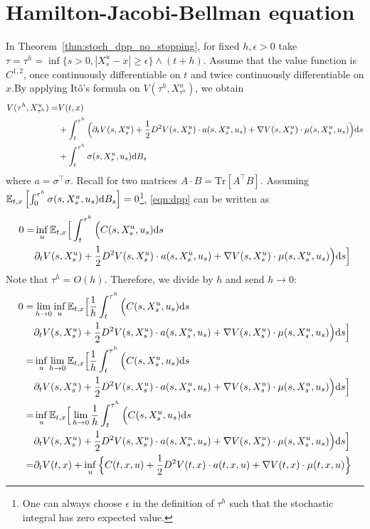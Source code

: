 \documentclass[11pt]{book}
\newcommand{\dd}{\text{\normalfont d}}
\newcommand{\ds}{\text{\normalfont d}s}
\begin{document}
\section{Hamilton-Jacobi-Bellman equation}
In Theorem~\ref{thm:stoch_dpp_no_stopping}, for fixed $h,\epsilon>0$ take $\tau=\tau^h=\inf\{s>0, |X_s^u-x|\ge \epsilon\}\wedge (t+h)$. Assume that the value function is $C^{1,2}$, once continuously differentiable on $t$ and twice continuously differentiable on $x$.By applying It\^o's formula on $V({\tau^h},X_{\tau^h}^u)$, we obtain
\begin{equation}
\begin{split}
    V({\tau^h},X_{\tau^h}^u)=&V(t,x)\\
    &+\int_t^{\tau^h} \Big(\partial_t V(s,X_s^u)+\frac12 D^2V(s,X_s^u) \cdot a(s,X_s^u,u_s) + \nabla V(s,X_s^u)\cdot \mu(s,X_s^u,u_s)\Big){{\ds}}\\
    &+\int_t^{\tau^h} \sigma(s,X_s^u,u_s){\dd}B_s
\end{split}
\end{equation}
where $a=\sigma^\intercal\sigma$. Recall  for two matrices $A\cdot B=\textrm{Tr}[A^\intercal B]$.  Assuming $\mathbb{E}_{t,x}\left[\int_0^{\tau^h} \sigma(s,X_s^u,u_s){\dd}B_s\right]=0$\footnote{One can always choose $\epsilon$ in the definition of ${\tau^h}$ such that the stochastic integral has zero expected value.}, \eqref{eqn:dpp} can be written as
\begin{equation}
    \begin{split}
        0 =&\inf_{u}\mathbb{E}_{t,x}\Big[\int_t^{\tau^h} \Big( C(s,X^u_s,u_s){{\ds}} \\
        & \partial_t V(s,X_s^u)+\frac12 D^2V(s,X_s^u) \cdot a(s,X_s^u,u_s) + \nabla V(s,X_s^u)\cdot \mu(s,X_s^u,u_s)\Big){{\ds}}\Big]
    \end{split}
\end{equation}
Note that ${\tau^h}=O(h)$. Therefore, we divide by $h$ and send $h\to0$:
\begin{equation}
    \begin{split}
        0 =&\lim_{h\to0}\inf_{u}\mathbb{E}_{t,x}\Big[\frac1h\int_t^{\tau^h} \Big( C(s,X^u_s,u_s){{\ds}} \\
        & \partial_t V(s,X_s^u)+\frac12 D^2V(s,X_s^u) \cdot a(s,X_s^u,u_s) + \nabla V(s,X_s^u)\cdot \mu(s,X_s^u,u_s)\Big){{\ds}}\Big]\\
        =&\inf_{u}\lim_{h\to0} \mathbb{E}_{t,x}\Big[\frac1h\int_t^{\tau^h} \Big( C(s,X^u_s,u_s){{\ds}} \\
        & \partial_t V(s,X_s^u)+\frac12 D^2V(s,X_s^u) \cdot a(s,X_s^u,u_s) + \nabla V(s,X_s^u)\cdot \mu(s,X_s^u,u_s)\Big){{\ds}}\Big]\\
        =&\inf_{u} \mathbb{E}_{t,x}\Big[\lim_{h\to0}\frac1h\int_t^{\tau^h} \Big( C(s,X^u_s,u_s){{\ds}} \\
        & \partial_t V(s,X_s^u)+\frac12 D^2V(s,X_s^u) \cdot a(s,X_s^u,u_s) + \nabla V(s,X_s^u)\cdot \mu(s,X_s^u,u_s)\Big){{\ds}}\Big]\\
        =&\partial_t V(t,x)+\inf_{u}\Big\{C(t,x,u) +
         \frac12 D^2V(t,x) \cdot a(t,x,u) + \nabla V(t,x)\cdot \mu(t,x,u)\Big\}
    \end{split}
\end{equation}
\end{document}

